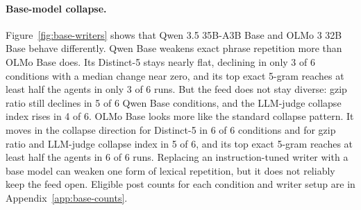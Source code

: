 \documentclass[11pt]{article}
\begin{document}
\paragraph{Base-model collapse.}
Figure~\ref{fig:base-writers} shows that Qwen 3.5 35B-A3B Base \citep{qwenteam2026qwen35} and OLMo 3 32B Base \citep{olmo3team2025} behave differently. Qwen Base weakens exact phrase repetition more than OLMo Base does. Its Distinct-5 stays nearly flat, declining in only 3 of 6 conditions with a median change near zero, and its top exact 5-gram reaches at least half the agents in only 3 of 6 runs. But the feed does not stay diverse: gzip ratio still declines in 5 of 6 Qwen Base conditions, and the LLM-judge collapse index rises in 4 of 6. OLMo Base looks more like the standard collapse pattern. It moves in the collapse direction for Distinct-5 in 6 of 6 conditions and for gzip ratio and LLM-judge collapse index in 5 of 6, and its top exact 5-gram reaches at least half the agents in 6 of 6 runs. Replacing an instruction-tuned writer with a base model can weaken one form of lexical repetition, but it does not reliably keep the feed open. Eligible post counts for each condition and writer setup are in Appendix~\ref{app:base-counts}.
\end{document}
